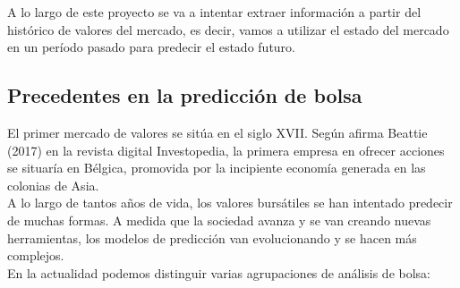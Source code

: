 A lo largo de este proyecto se va a intentar extraer informaci\'on a partir del hist\'orico de valores del mercado, es decir, vamos a utilizar el estado del mercado en un per\'iodo pasado para predecir el estado futuro. \\


\subsection{Precedentes en la predicci\'on de bolsa}
El primer mercado de valores se sit\'ua en el siglo XVII. Seg\'un afirma Beattie (2017) en la revista digital Investopedia, la primera empresa en ofrecer acciones se situar\'ia en B\'elgica, promovida por la incipiente econom\'ia generada en las colonias de Asia. \\

A lo largo de tantos a\~nos de vida, los valores burs\'atiles se han intentado predecir de muchas formas. A medida que la sociedad avanza y se van creando nuevas herramientas, los modelos de predicci\'on van evolucionando y se hacen m\'as complejos.\\

En la actualidad podemos distinguir varias agrupaciones de an\'alisis de bolsa:\\

